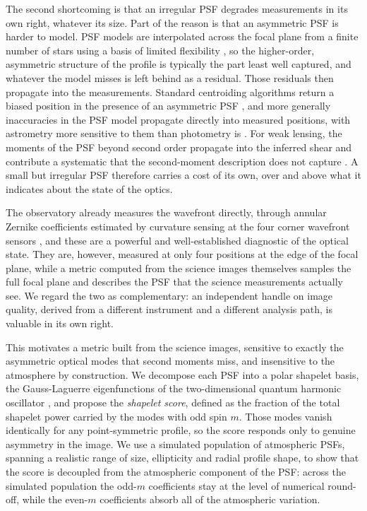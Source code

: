 \documentclass[]{spie}
\begin{document}
The second shortcoming is that an irregular PSF degrades measurements in its own right,
whatever its size. Part of the reason is that an asymmetric PSF is harder to model. PSF
models are interpolated across the focal plane from a finite number of stars using a basis
of limited flexibility \cite{Jarvis2021}, so the higher-order, asymmetric structure of the
profile is typically the part least well captured, and whatever the model misses is left
behind as a residual. Those residuals then propagate into the measurements. Standard
centroiding algorithms return a biased position in the presence of an asymmetric PSF
\cite{Pier2003}, and more generally inaccuracies in the PSF model propagate directly into
measured positions, with astrometry more sensitive to them than photometry is
\cite{AndersonKing2000}. For weak lensing, the moments of the PSF beyond second order
propagate into the inferred shear and contribute a systematic that the second-moment
description does not capture \cite{Zhang2023}. A small but irregular PSF therefore carries
a cost of its own, over and above what it indicates about the state of the optics.

The observatory already measures the wavefront directly, through annular Zernike
coefficients estimated by curvature sensing at the four corner wavefront sensors
\cite{Xin2015}, and these are a powerful and well-established diagnostic of the optical
state. They are, however, measured at only four positions at the edge of the focal plane,
while a metric computed from the science images themselves samples the full focal plane
and describes the PSF that the science measurements actually see. We regard the two as
complementary: an independent handle on image quality, derived from a different instrument
and a different analysis path, is valuable in its own right.

This motivates a metric built from the science images, sensitive to exactly the asymmetric
optical modes that second moments miss, and insensitive to the atmosphere by construction.
We decompose each PSF into a polar shapelet basis, the Gauss-Laguerre eigenfunctions of
the two-dimensional quantum harmonic oscillator
\cite{Refregier2003, MasseyRefregier2005, BernsteinJarvis2002}, and propose the
\emph{shapelet score}, defined as the fraction of the total shapelet power carried by the
modes with odd spin $m$. Those modes vanish identically for any point-symmetric
profile, so the score responds only to genuine asymmetry in the image. We use a simulated
population of atmospheric PSFs, spanning a realistic range of size, ellipticity and radial
profile shape, to show that the score is decoupled from the atmospheric component of the
PSF: across the simulated population the odd-$m$ coefficients stay at the level of
numerical round-off, while the even-$m$ coefficients absorb all of the atmospheric
variation.
\end{document}
